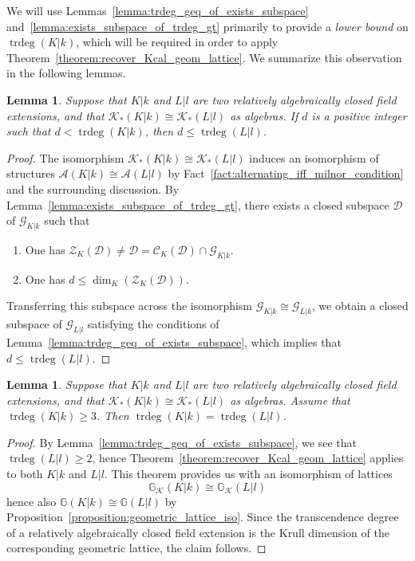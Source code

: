 \documentclass[12pt]{amsart}
\newcommand{\Gbb}{\mathbb{G}}
\newcommand{\trdeg}{\operatorname{trdeg}}
\newcommand{\Ascr}{\mathscr{A}}
\newcommand{\Zcal}{\mathcal{Z}}
\newcommand{\Ccal}{\mathcal{C}}
\newcommand{\Gcal}{\mathcal{G}}
\newcommand{\Dcal}{\mathcal{D}}
\newcommand{\Kcal}{\mathcal{K}}
\newtheorem{lemma}[theorem]{Lemma}
\theoremstyle{definition}
\begin{document}
We will use Lemmas~\ref{lemma:trdeg_geq_of_exists_subspace} and~\ref{lemma:exists_subspace_of_trdeg_gt} primarily to provide a \emph{lower bound} on $\trdeg(K|k)$, which will be required in order to apply Theorem~\ref{theorem:recover_Kcal_geom_lattice}.
We summarize this observation in the following lemmas.
\begin{lemma}\label{lemma:le_trdeg_of_iso_of_lt_trdeg}
  Suppose that $K|k$ and $L|l$ are two relatively algebraically closed field extensions, and that $\Kcal_{*}(K|k) \cong \Kcal_{*}(L|l)$ as algebras.
  If $d$ is a positive integer such that $d < \trdeg(K|k)$, then $d \leq \trdeg(L|l)$.
\end{lemma}
\begin{proof}
  The isomorphism $\Kcal_{*}(K|k) \cong \Kcal_{*}(L|l)$ induces an isomorphism of structures $\Ascr(K|k) \cong \Ascr(L|l)$ by Fact~\ref{fact:alternating_iff_milnor_condition} and the surrounding discussion.
  By Lemma~\ref{lemma:exists_subspace_of_trdeg_gt}, there exists a closed subspace $\Dcal$ of $\Gcal_{K|k}$ such that
  \begin{enumerate}
    \item One has $\Zcal_{K}(\Dcal) \neq \Dcal = \Ccal_{K}(\Dcal) \cap \Gcal_{K|k}$.
    \item One has $d \le \dim_{K}(\Zcal_{K}(\Dcal))$.
  \end{enumerate}
  Transferring this subspace across the isomorphism $\Gcal_{K|k} \cong \Gcal_{L|k}$, we obtain a closed subspace of $\Gcal_{L|l}$ satisfying the conditions of Lemma~\ref{lemma:trdeg_geq_of_exists_subspace}, which implies that $d \le \trdeg(L|l)$.
\end{proof}

\begin{lemma}\label{lemma:trdeg_eq_of_iso}
  Suppose that $K|k$ and $L|l$ are two relatively algebraically closed field extensions, and that $\Kcal_{*}(K|k) \cong \Kcal_{*}(L|l)$ as algebras.
  Assume that $\trdeg(K|k) \geq 3$.
  Then $\trdeg(K|k) = \trdeg(L|l)$.
\end{lemma}
\begin{proof}
  By Lemma~\ref{lemma:trdeg_geq_of_exists_subspace}, we see that $\trdeg(L|l) \geq 2$, hence Theorem~\ref{theorem:recover_Kcal_geom_lattice} applies to both $K|k$ and $L|l$.
  This theorem provides us with an isomorphism of lattices
  \[ \Gbb_{\Kcal}(K|k) \cong \Gbb_{\Kcal}(L|l) \]
  hence also $\Gbb(K|k) \cong \Gbb(L|l)$ by Proposition~\ref{proposition:geometric_lattice_iso}.
  Since the transcendence degree of a relatively algebraically closed field extension is the Krull dimension of the corresponding geometric lattice, the claim follows.
\end{proof}
\end{document}
